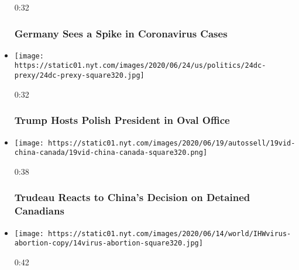 \begin{itemize}
  0:32

  \hypertarget{germany-sees-a-spike-in-coronavirus-cases}{%
  \subsubsection{Germany Sees a Spike in Coronavirus
  Cases}\label{germany-sees-a-spike-in-coronavirus-cases}}
\item
  \href{https://www.nytimes.com/video/us/100000007208621/trump-hosts-polish-president.html?action=click\&module=video-series-bar\&region=header\&pgtype=Article\&playlistId=video/world}{}

  \texttt{[image: https://static01.nyt.com/images/2020/06/24/us/politics/24dc-prexy/24dc-prexy-square320.jpg]}

  0:32

  \hypertarget{trump-hosts-polish-president-in-oval-office}{%
  \subsubsection{Trump Hosts Polish President in Oval
  Office}\label{trump-hosts-polish-president-in-oval-office}}
\item
  \href{https://www.nytimes.com/video/us/100000007200829/trudeau-china-indictment.html?action=click\&module=video-series-bar\&region=header\&pgtype=Article\&playlistId=video/world}{}

  \texttt{[image: https://static01.nyt.com/images/2020/06/19/autossell/19vid-china-canada/19vid-china-canada-square320.png]}

  0:38

  \hypertarget{trudeau-reacts-to-chinas-decision-on-detained-canadians}{%
  \subsubsection{Trudeau Reacts to China's Decision on Detained
  Canadians}\label{trudeau-reacts-to-chinas-decision-on-detained-canadians}}
\item
  \href{https://www.nytimes.com/video/us/100000007199389/women-protest-changes-to-polands-abortion-laws.html?action=click\&module=video-series-bar\&region=header\&pgtype=Article\&playlistId=video/world}{}

  \texttt{[image: https://static01.nyt.com/images/2020/06/14/world/IHWvirus-abortion-copy/14virus-abortion-square320.jpg]}

  0:42

  \hypertarget{women-protest-changes-to-polands-abortion-laws}{%
}
\end{itemize}
